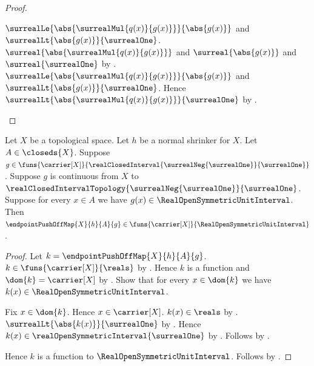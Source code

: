 \begin{proof}
\begin{subproof}
\begin{byCase}
            $\surrealLe{\abs{\surrealMul{q(x)}{g(x)}}}
                {\abs{g(x)}}$ and
                $\surrealLt{\abs{g(x)}}{\surrealOne}$.
            $\surreal{\abs{\surrealMul{q(x)}{g(x)}}}$ and
                $\surreal{\abs{g(x)}}$ and $\surreal{\surrealOne}$
                by
                .
            $\surrealLe{\abs{\surrealMul{q(x)}{g(x)}}}
                {\abs{g(x)}}$ and
                $\surrealLt{\abs{g(x)}}{\surrealOne}$.
            Hence
                $\surrealLt{\abs{\surrealMul{q(x)}{g(x)}}}
                    {\surrealOne}$
                by
                .
        \end{byCase}
    \end{subproof}
\end{proof}

\begin{theorem}\label{endpoint_push_off_map_typed_open_interval}
    Let $X$ be a topological space.
    Let $h$ be a normal shrinker for $X$.
    Let $A\in\closeds{X}$.
    Suppose
        $g\in\funs{\carrier[X]}
            {\realClosedInterval
                {\surrealNeg{\surrealOne}}{\surrealOne}}$.
    Suppose $g$ is continuous from $X$ to
        $\realClosedIntervalTopology
            {\surrealNeg{\surrealOne}}{\surrealOne}$.
    Suppose for every $x\in A$ we have
        $g(x)\in\RealOpenSymmetricUnitInterval$.
    Then $\endpointPushOffMap{X}{h}{A}{g}
        \in\funs{\carrier[X]}{\RealOpenSymmetricUnitInterval}$.
\end{theorem}
\begin{proof}
    Let $k=\endpointPushOffMap{X}{h}{A}{g}$.
    $k\in\funs{\carrier[X]}{\reals}$
        by .
    Hence $k$ is a function and $\dom{k}=\carrier[X]$
        by .
    Show that for every $x\in\dom{k}$ we have
        $k(x)\in\RealOpenSymmetricUnitInterval$.
    \begin{subproof}
        Fix $x\in\dom{k}$.
        Hence $x\in\carrier[X]$.
        $k(x)\in\reals$ by .
        $\surrealLt{\abs{k(x)}}{\surrealOne}$
            by .
        Hence $k(x)\in\realOpenSymmetricInterval{\surrealOne}$
            by
            .
        Follows by
            .
    \end{subproof}
    Hence $k$ is a function to $\RealOpenSymmetricUnitInterval$.
    Follows by .
\end{proof}

